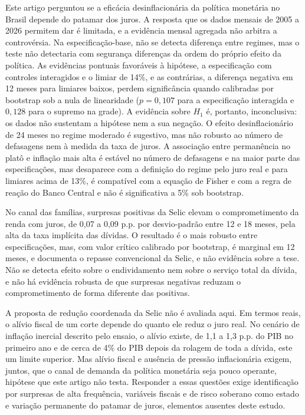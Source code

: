 \documentclass[12pt,a4paper]{article}
\begin{document}
Este artigo perguntou se a eficácia desinflacionária da política monetária no Brasil depende do patamar dos juros. A resposta que os dados mensais de 2005 a 2026 permitem dar é limitada, e a evidência mensal agregada não arbitra a controvérsia. Na especificação-base, não se detecta diferença entre regimes, mas o teste não detectaria com segurança diferenças da ordem do próprio efeito da política. As evidências pontuais favoráveis à hipótese, a especificação com controles interagidos e o limiar de 14\%, e as contrárias, a diferença negativa em 12 meses para limiares baixos, perdem significância quando calibradas por bootstrap sob a nula de linearidade ($p = 0{,}107$ para a especificação interagida e $0{,}128$ para o supremo na grade). A evidência sobre $H_1$ é, portanto, inconclusiva: os dados não sustentam a hipótese nem a sua negação. O efeito desinflacionário de 24 meses no regime moderado é sugestivo, mas não robusto ao número de defasagens nem à medida da taxa de juros. A associação entre permanência no platô e inflação mais alta é estável no número de defasagens e na maior parte das especificações, mas desaparece com a definição do regime pelo juro real e para limiares acima de 13\%, é compatível com a equação de Fisher e com a regra de reação do Banco Central e não é significativa a 5\% sob bootstrap.

No canal das famílias, surpresas positivas da Selic elevam o comprometimento da renda com juros, de 0,07 a 0,09 p.p. por desvio-padrão entre 12 e 18 meses, pela alta da taxa implícita das dívidas. O resultado é o mais robusto entre especificações, mas, com valor crítico calibrado por bootstrap, é marginal em 12 meses, e documenta o repasse convencional da Selic, e não evidência sobre a tese. Não se detecta efeito sobre o endividamento nem sobre o serviço total da dívida, e não há evidência robusta de que surpresas negativas reduzam o comprometimento de forma diferente das positivas.

A proposta de redução coordenada da Selic não é avaliada aqui. Em termos reais, o alívio fiscal de um corte depende do quanto ele reduz o juro real. No cenário de inflação inercial descrito pelo ensaio, o alívio existe, de 1,1 a 1,3 p.p. do PIB no primeiro ano e de cerca de 4\% do PIB depois da rolagem de toda a dívida, este um limite superior. Mas alívio fiscal e ausência de pressão inflacionária exigem, juntos, que o canal de demanda da política monetária seja pouco operante, hipótese que este artigo não testa. Responder a essas questões exige identificação por surpresas de alta frequência, variáveis fiscais e de risco soberano como estado e variação permanente do patamar de juros, elementos ausentes deste estudo.
\end{document}
